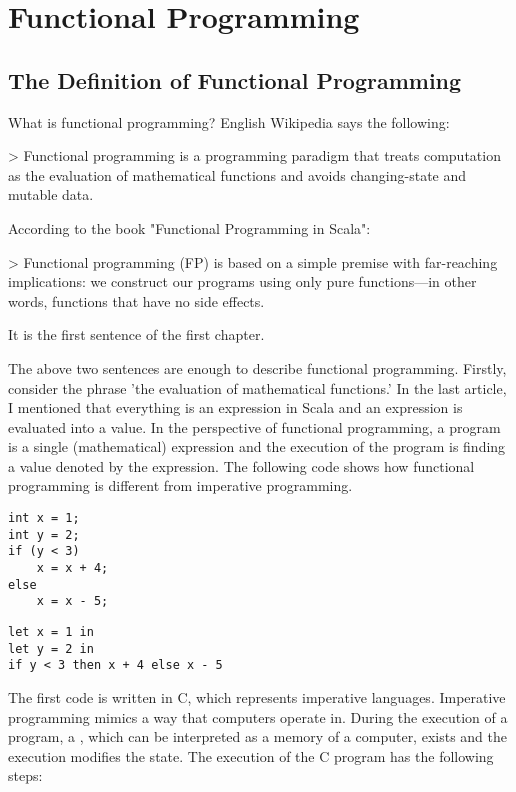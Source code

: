\setchapterpreamble[u]{\margintoc}
\chapter{Functional Programming}

\section{The Definition of Functional Programming}

What is functional programming? English Wikipedia says the following:

> Functional programming is a programming paradigm that treats computation as the
evaluation of mathematical functions and avoids changing-state and mutable data.

According to the book "Functional Programming in Scala":

> Functional programming (FP) is based on a simple premise with far-reaching
implications: we construct our programs using only pure functions—in other words,
functions that have no side effects.

It is the first sentence of the first chapter.

The above two sentences are enough to describe functional programming. Firstly,
consider the phrase 'the evaluation of mathematical functions.' In the last
article, I mentioned that everything is an expression in Scala and an expression
is evaluated into a value. In the perspective of functional programming, a
program is a single (mathematical) expression and the execution of the program is
finding a value denoted by the expression. The following code shows how
functional programming is different from imperative programming.

\begin{verbatim}
int x = 1;
int y = 2;
if (y < 3)
    x = x + 4;
else
    x = x - 5;
\end{verbatim}

\begin{verbatim}
let x = 1 in
let y = 2 in
if y < 3 then x + 4 else x - 5
\end{verbatim}

The first code is written in C, which represents imperative languages. Imperative
programming mimics a way that computers operate in. During the execution of a
program, a , which can be interpreted as a memory of a computer,
exists and the execution modifies the state. The execution of the C program has
the following steps:

